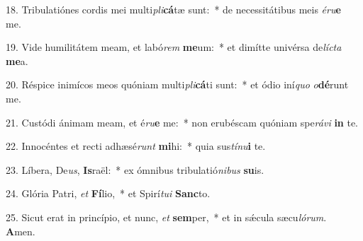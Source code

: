 18. Tribulatiónes cordis mei multi\textit{pli}\textbf{cá}tæ sunt:~*  de necessitátibus meis \textit{é}\textit{ru}\textbf{e} me.\

19. Vide humilitátem meam, et labó\textit{rem} \textbf{me}um:~*  et dimítte univérsa de\textit{líc}\textit{ta} \textbf{me}a.\

20. Réspice inimícos meos quóniam multi\textit{pli}\textbf{cá}ti sunt:~*  et ódio iní\textit{quo} \textit{o}\textbf{dé}runt me.\

21. Custódi ánimam meam, et é\textit{ru}\textbf{e} me:~*  non erubéscam quóniam spe\textit{rá}\textit{vi} \textbf{in} te.\

22. Innocéntes et recti adhæsé\textit{runt} \textbf{mi}hi:~*  quia sus\textit{tí}\textit{nu}\textbf{i} te.\

23. Líbera, De\textit{us}, \textbf{Is}raël:~*  ex ómnibus tribulatió\textit{ni}\textit{bus} \textbf{su}is.\

24. Glória Patri, \textit{et} \textbf{Fí}lio,~*  et Spirí\textit{tu}\textit{i} \textbf{Sanc}to.\

25. Sicut erat in princípio, et nunc, \textit{et} \textbf{sem}per,~*  et in sǽcula sæcu\textit{ló}\textit{rum}. \textbf{A}men.\

